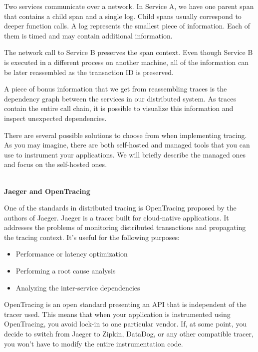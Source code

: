 Two services communicate over a network. In Service A, we have one parent span that contains a child span and a single log. Child spans usually correspond to deeper function calls. A log represents the smallest piece of information. Each of them is timed and may contain additional information.

The network call to Service B preserves the span context. Even though Service B is executed in a different process on another machine, all of the information can be later reassembled as the transaction ID is preserved.

A piece of bonus information that we get from reassembling traces is the dependency graph between the services in our distributed system. As traces contain the entire call chain, it is possible to visualize this information and inspect unexpected dependencies.


There are several possible solutions to choose from when implementing tracing. As you may imagine, there are both self-hosted and managed tools that you can use to instrument your applications. We will briefly describe the managed ones and focus on the self-hosted ones.

\hspace*{\fill} \\ %
\noindent
\textbf{Jaeger and OpenTracing}

One of the standards in distributed tracing is OpenTracing proposed by the authors of Jaeger. Jaeger is a tracer built for cloud-native applications. It addresses the problems of monitoring distributed transactions and propagating the tracing context. It's useful for the following purposes:

\begin{itemize}
\item 
Performance or latency optimization

\item 
Performing a root cause analysis

\item 
Analyzing the inter-service dependencies
\end{itemize}

OpenTracing is an open standard presenting an API that is independent of the tracer used. This means that when your application is instrumented using OpenTracing, you avoid lock-in to one particular vendor. If, at some point, you decide to switch from Jaeger to Zipkin, DataDog, or any other compatible tracer, you won't have to modify the entire instrumentation code.

